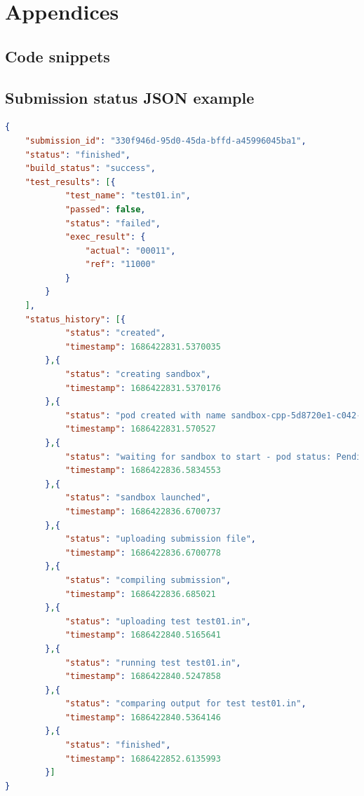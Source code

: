 \documentclass[12pt,a4paper]{report}
\begin{document}
\chapter*{Appendices}
\begin{appendices}

\chapter{Code snippets}
\label{anexa:cod}
\section{Submission status JSON example}
\label{anexa:cod:json-submission}
\begin{lstlisting}[language=json,firstnumber=1]
{
	"submission_id": "330f946d-95d0-45da-bffd-a45996045ba1",
	"status": "finished",
	"build_status": "success",
	"test_results": [{
			"test_name": "test01.in",
			"passed": false,
			"status": "failed",
			"exec_result": {
				"actual": "00011",
				"ref": "11000"
			}
		}
	],
	"status_history": [{
			"status": "created",
			"timestamp": 1686422831.5370035
		},{
			"status": "creating sandbox",
			"timestamp": 1686422831.5370176
		},{
			"status": "pod created with name sandbox-cpp-5d8720e1-c042-43ea-a95a-e8e268c6f0be",
			"timestamp": 1686422831.570527
		},{
			"status": "waiting for sandbox to start - pod status: Pending",
			"timestamp": 1686422836.5834553
		},{
			"status": "sandbox launched",
			"timestamp": 1686422836.6700737
		},{
			"status": "uploading submission file",
			"timestamp": 1686422836.6700778
		},{
			"status": "compiling submission",
			"timestamp": 1686422836.685021
		},{
			"status": "uploading test test01.in",
			"timestamp": 1686422840.5165641
		},{
			"status": "running test test01.in",
			"timestamp": 1686422840.5247858
		},{
			"status": "comparing output for test test01.in",
			"timestamp": 1686422840.5364146
		},{
			"status": "finished",
			"timestamp": 1686422852.6135993
		}]
}
\end{lstlisting}


\end{appendices}
\end{document}
